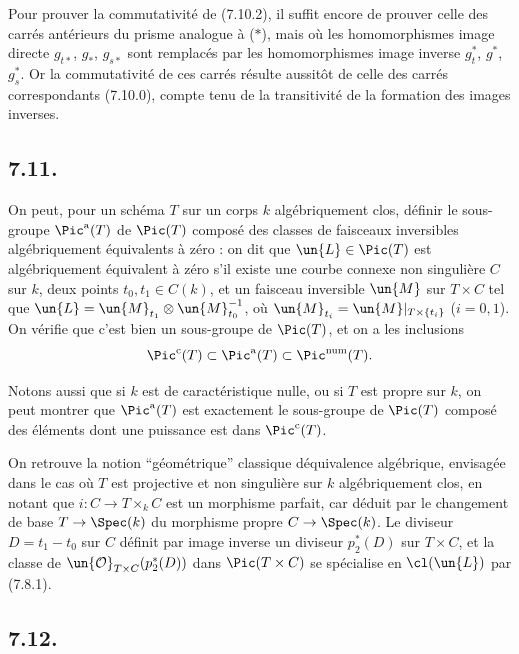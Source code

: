 Pour prouver la commutativit\'e de (7.10.2), il suffit encore de prouver celle des carr\'es ant\'erieurs du prisme analogue \`a ($*$), mais o\`u les homomorphismes image directe $g_{t*}$, $g_{*}$, $g_{s*}$ sont remplac\'es par les homomorphismes image inverse $g_{t}^{*}$, $g^{*}$, $g_{s}^{*}$. Or la commutativit\'e de ces carr\'es r\'esulte aussit\^ot de celle des carr\'es correspondants (7.10.0), compte tenu de la transitivit\'e de la formation des images inverses.

\subsection*{7.11.}

On peut, pour un sch\'ema $T$ sur un corps $k$ alg\'ebriquement clos, d\'efinir le sous-groupe $\Pic^{\mathrm{a}}(T)$ de $\Pic(T)$ compos\'e des classes de faisceaux inversibles alg\'ebriquement \'equivalents \`a z\'ero : on dit que $\un{L} \in \Pic(T)$ est alg\'ebriquement \'equivalent \`a z\'ero s'il existe une courbe connexe non singuli\`ere $C$ sur $k$, deux points $t_{0}, t_{1} \in C(k)$, et un faisceau inversible $\un{M}$ sur $T \times C$ tel que $\un{L} = \un{M}_{t_{1}} \otimes \un{M}_{t_{0}}^{-1}$, o\`u $\un{M}_{t_{i}} = \un{M}|_{T \times \{t_{i}\}}$ ($i = 0, 1$). On v\'erifie que c'est bien un sous-groupe de $\Pic(T)$, et on a les inclusions
\[
\Pic^{\mathrm{c}}(T) \subset \Pic^{\mathrm{a}}(T) \subset \Pic^{\mathrm{num}}(T).
\]

Notons aussi que si $k$ est de caract\'eristique nulle, ou si $T$ est propre sur $k$, on peut montrer que $\Pic^{\mathrm{a}}(T)$ est exactement le sous-groupe de $\Pic(T)$ compos\'e des \'el\'ements dont une puissance est dans $\Pic^{\mathrm{c}}(T)$.

On retrouve la notion ``g\'eom\'etrique'' classique d\'equivalence alg\'ebrique, envisag\'ee dans le cas o\`u $T$ est projective et non singuli\`ere sur $k$ alg\'ebriquement clos, en notant que $i : C \to T \times_{k} C$ est un morphisme parfait, car d\'eduit par le changement de base $T \to \Spec(k)$ du morphisme propre $C \to \Spec(k)$. Le diviseur $D = t_{1} - t_{0}$ sur $C$ d\'efinit par image inverse un diviseur $p_{2}^{*}(D)$ sur $T \times C$, et la classe de $\un{\mathcal{O}}_{T \times C}(p_{2}^{*}(D))$ dans $\Pic(T \times C)$ se sp\'ecialise en $\cl(\un{L})$ par (7.8.1).

\subsection*{7.12.}

